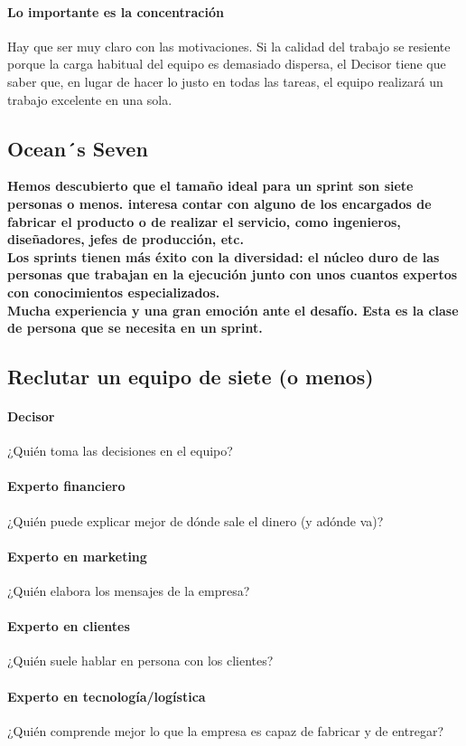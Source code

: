 \documentclass[10pt]{article}
\begin{document}
\begin{multicols}{2}
\paragraph*{Lo importante es la concentración}
Hay que ser muy claro con las motivaciones. Si la calidad del trabajo se resiente porque la carga habitual del equipo es demasiado dispersa, el Decisor tiene que saber que, en lugar de hacer lo justo en todas las tareas, el equipo realizará un trabajo excelente en una sola.
\subsection*{Ocean´s Seven}
\textbf{Hemos descubierto que el tamaño ideal para un sprint son siete personas o menos. interesa contar con alguno de los encargados de fabricar el producto o de realizar el servicio, como ingenieros, diseñadores, jefes de producción, etc.}\\
\textbf{ Los sprints tienen más éxito con la diversidad: el núcleo duro de las personas que trabajan en la ejecución junto con unos cuantos expertos con conocimientos especializados.}\\
\textbf{Mucha experiencia y una gran emoción ante el desafío. Esta es la clase de persona que se necesita en un sprint.}
\subsection*{Reclutar un equipo de siete (o menos)}
\paragraph*{Decisor}
¿Quién toma las decisiones en el equipo? 
\paragraph*{Experto financiero}
¿Quién puede explicar mejor de dónde sale el dinero (y adónde va)?
\paragraph*{Experto en marketing}
¿Quién elabora los mensajes de la empresa?
\paragraph*{Experto en clientes}
¿Quién suele hablar en persona con los clientes?
\paragraph*{Experto en tecnología/logística}
¿Quién comprende mejor lo que la empresa es capaz de fabricar y de entregar?

\end{multicols}
\end{document}
